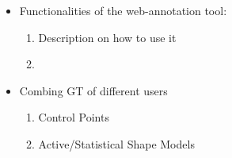 \begin{itemize}
\item Functionalities of the web-annotation tool:
\begin{enumerate}
\item Description on how to use it
\item 
\end{enumerate}
\item Combing GT of different users
\begin{enumerate}
\item Control Points
\item Active/Statistical Shape Models
\end{enumerate}
\end{itemize}


